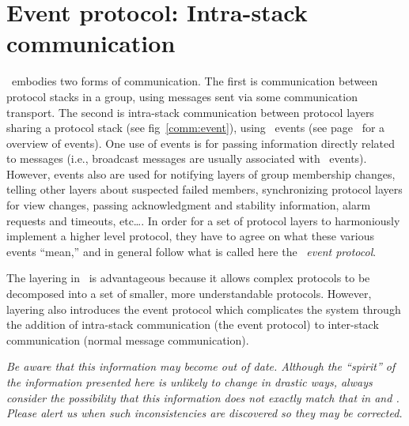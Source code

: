 \newcommand {\eventtype}[2]    {\item {#1:} #2}

\newenvironment{EventType}{%
\begin{itemize}
}{\end{itemize}
}

\newcommand {\chainentry}[2]    {#1 & #2 \\ \hline}

\newenvironment{ChainTable}{%
\begin{quote}\begin{tabular}{|l|l|} \hline
}{\end{tabular}\end{quote}
}

\section{Event protocol: Intra-stack communication}
\label{event:protocol}
\ensemble\ embodies two forms of communication.  The first is
communication between protocol stacks in a group, using messages sent
via some communication transport.  The second is intra-stack
communication between protocol layers sharing a protocol stack (see
fig~\ref{comm:event}), using \ensemble\ events (see
page~\pageref{event:module} for a overview of \ensemble events).  One
use of events is for passing information directly related to messages
(i.e., broadcast messages are usually associated with \ECast\ events).
However, events also are used for notifying layers of group membership
changes, telling other layers about suspected failed members,
synchronizing protocol layers for view changes, passing acknowledgment
and stability information, alarm requests and timeouts, etc\ldots.  In
order for a set of protocol layers to harmoniously implement a higher
level protocol, they have to agree on what these various events
``mean,'' and in general follow what is called here the \ensemble\
\emph{event protocol}.

The layering in \ensemble\ is advantageous because it allows complex protocols
to be decomposed into a set of smaller, more understandable protocols.
However, layering also introduces the event protocol which complicates the
system through the addition of intra-stack communication (the event
protocol) to inter-stack communication (normal message communication).

\emph{Be aware that this information may become out of date.  Although the
``spirit'' of the information presented here is unlikely to change in
drastic ways, always consider the possibility that this information does
not exactly match that in \sourcetype{event.ml} and .
Please alert us when such inconsistencies are discovered so they may be
corrected.}

